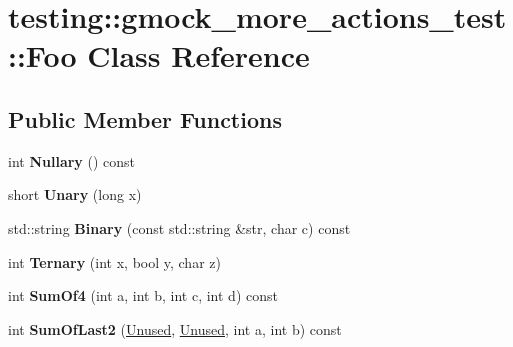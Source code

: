 \hypertarget{classtesting_1_1gmock__more__actions__test_1_1Foo}{}\section{testing\+:\+:gmock\+\_\+more\+\_\+actions\+\_\+test\+:\+:Foo Class Reference}
\label{classtesting_1_1gmock__more__actions__test_1_1Foo}
\subsection*{Public Member Functions}
\begin{DoxyCompactItemize}
\item 
\mbox{\label{classtesting_1_1gmock__more__actions__test_1_1Foo_ad6ba38dbb9b1594ac178630f07c4baa5}} 
int {\bfseries Nullary} () const
\item 
\mbox{\label{classtesting_1_1gmock__more__actions__test_1_1Foo_a68d2b46d6cc7d51979b0254940af6090}} 
short {\bfseries Unary} (long x)
\item 
\mbox{\label{classtesting_1_1gmock__more__actions__test_1_1Foo_a8ee56742c6c025af680617464c71ecef}} 
std\+::string {\bfseries Binary} (const std\+::string \&str, char c) const
\item 
\mbox{\label{classtesting_1_1gmock__more__actions__test_1_1Foo_afc5b86988210ad598fa3a2a9822297e4}} 
int {\bfseries Ternary} (int x, bool y, char z)
\item 
\mbox{\label{classtesting_1_1gmock__more__actions__test_1_1Foo_a69ca68e84528904032bad9533a23fb0a}} 
int {\bfseries Sum\+Of4} (int a, int b, int c, int d) const
\item 
\mbox{\label{classtesting_1_1gmock__more__actions__test_1_1Foo_abc041eb7a8e8211656495f2540f315ec}} 
int {\bfseries Sum\+Of\+Last2} (\hyperlink{classtesting_1_1internal_1_1IgnoredValue}{Unused}, \hyperlink{classtesting_1_1internal_1_1IgnoredValue}{Unused}, int a, int b) const

\end{DoxyCompactItemize}
